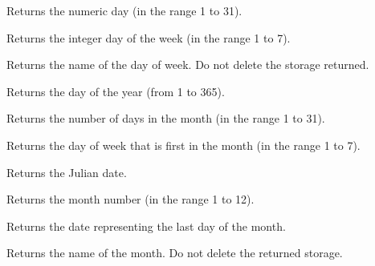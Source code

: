 Returns the numeric day (in the range 1 to 31).


 

Returns the integer day of the week (in the range 1 to 7).



Returns the name of the day of week. Do not delete the storage returned.


 

Returns the day of the year (from 1 to 365).


 

Returns the number of days in the month (in the range 1 to 31).


 

Returns the day of week that is first in the month (in the range 1 to 7).


 

Returns the Julian date.


 

Returns the month number (in the range 1 to 12).



Returns the date representing the last day of the month.



Returns the name of the month. Do not delete the returned storage.



